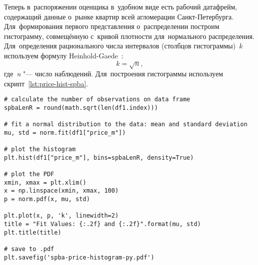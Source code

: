 \documentclass[]{scrreprt}
\begin{document}
Теперь в~распоряжении оценщика в~удобном виде есть рабочий датафрейм, содержащий данные о~рынке квартир всей агломерации Санкт-Петербурга. Для~формирования первого представления о~распределении построим гистограмму, совмещённую с~кривой плотности для~нормального распределения. Для~определения рационального числа интервалов (столбцов гистограммы)~$k$ используем формулу Heinhold-Gaede~\cite{Ingenieur-Statistik}:
\begin{equation}\label{eq:k-hist-Heinhold-Gaede}
k = \sqrt{n},
\end{equation}
где~\textit{n} "--- число наблюдений. Для~построения гистограммы используем скрипт~\ref{lst:price-hist-spba}.
%
\begin{lstlisting}[float, caption = Построение гистограммы для~агломерации Санкт-Петербурга, firstnumber=1, label= lst:price-hist-spba]
# calculate the number of observations on data frame
spbaLenR = round(math.sqrt(len(df1.index)))

# fit a normal distribution to the data: mean and standard deviation
mu, std = norm.fit(df1["price_m"])

# plot the histogram
plt.hist(df1["price_m"], bins=spbaLenR, density=True)

# plot the PDF
xmin, xmax = plt.xlim()
x = np.linspace(xmin, xmax, 100)
p = norm.pdf(x, mu, std)

plt.plot(x, p, 'k', linewidth=2)
title = "Fit Values: {:.2f} and {:.2f}".format(mu, std)
plt.title(title)

# save to .pdf
plt.savefig('spba-price-histogram-py.pdf')
\end{lstlisting}
%
\end{document}
